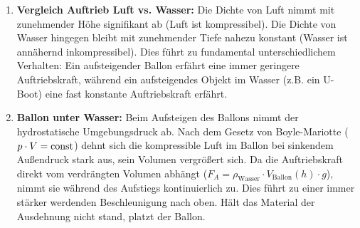 \documentclass[ngerman]{scrreprt}
\newenvironment{loesungbox}[1]
  {\needspace{5\baselineskip}\begin{loesungboxstyle}[frametitle={#1}]}
  {\end{loesungboxstyle}}
\begin{document}
\begin{loesungbox}{Lösung zu \Cref{aufg:heliumballons}}
\begin{enumerate}
    \item \textbf{Vergleich Auftrieb Luft vs. Wasser:} Die Dichte von Luft nimmt mit zunehmender Höhe signifikant ab (Luft ist kompressibel). Die Dichte von Wasser hingegen bleibt mit zunehmender Tiefe nahezu konstant (Wasser ist annähernd inkompressibel). Dies führt zu fundamental unterschiedlichem Verhalten: Ein aufsteigender Ballon erfährt eine immer geringere Auftriebskraft, während ein aufsteigendes Objekt im Wasser (z.B. ein U-Boot) eine fast konstante Auftriebskraft erfährt.
    \item \textbf{Ballon unter Wasser:} Beim Aufsteigen des Ballons nimmt der hydrostatische Umgebungsdruck ab. Nach dem Gesetz von Boyle-Mariotte ($p \cdot V = \mathrm{const}$) dehnt sich die kompressible Luft im Ballon bei sinkendem Außendruck stark aus, sein Volumen vergrößert sich. Da die Auftriebskraft direkt vom verdrängten Volumen abhängt ($F_A = \rho_{\text{Wasser}} \cdot V_{\text{Ballon}}(h) \cdot g$), nimmt sie während des Aufstiegs kontinuierlich zu. Dies führt zu einer immer stärker werdenden Beschleunigung nach oben. Hält das Material der Ausdehnung nicht stand, platzt der Ballon.
\end{enumerate}
\end{loesungbox}
\end{document}
